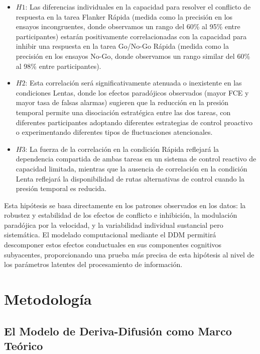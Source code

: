\documentclass[
  spanish,
  10pt,
]{article}
\begin{document}
\begin{itemize}
\item
  \(H1\): Las diferencias individuales en la capacidad para resolver el
  conflicto de respuesta en la tarea Flanker Rápida (medida como la
  precisión en los ensayos incongruentes, donde observamos un rango del
  60\% al 95\% entre participantes) estarán positivamente
  correlacionadas con la capacidad para inhibir una respuesta en la
  tarea Go/No-Go Rápida (medida como la precisión en los ensayos No-Go,
  donde observamos un rango similar del 60\% al 98\% entre
  participantes).
\item
  \(H2\): Esta correlación será significativamente atenuada o
  inexistente en las condiciones Lentas, donde los efectos paradójicos
  observados (mayor FCE y mayor tasa de falsas alarmas) sugieren que la
  reducción en la presión temporal permite una disociación estratégica
  entre las dos tareas, con diferentes participantes adoptando
  diferentes estrategias de control proactivo o experimentando
  diferentes tipos de fluctuaciones atencionales.
\item
  \(H3\): La fuerza de la correlación en la condición Rápida reflejará
  la dependencia compartida de ambas tareas en un sistema de control
  reactivo de capacidad limitada, mientras que la ausencia de
  correlación en la condición Lenta reflejará la disponibilidad de rutas
  alternativas de control cuando la presión temporal es reducida.
\end{itemize}

Esta hipótesis se basa directamente en los patrones observados en los
datos: la robustez y estabilidad de los efectos de conflicto e
inhibición, la modulación paradójica por la velocidad, y la variabilidad
individual sustancial pero sistemática. El modelado computacional
mediante el DDM permitirá descomponer estos efectos conductuales en sus
componentes cognitivos subyacentes, proporcionando una prueba más
precisa de esta hipótesis al nivel de los parámetros latentes del
procesamiento de información.

\section{Metodología}\label{metodologuxeda}

\subsection{El Modelo de Deriva-Difusión como Marco
Teórico}\label{el-modelo-de-deriva-difusiuxf3n-como-marco-teuxf3rico}
\end{document}
